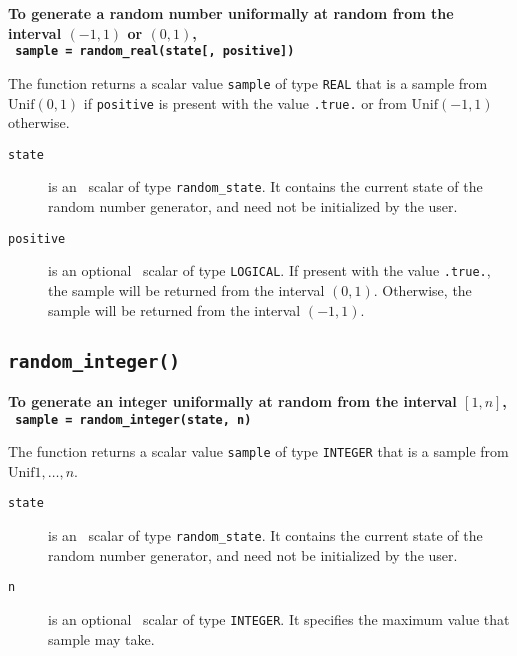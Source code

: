 \textbf{\noindent
   To generate a random number uniformally at random from the interval $(-1,1)$ or $(0,1)$,
   \vspace*{0.1cm} \\
   \texttt{ \hspace*{0.2cm}
      sample = random\_real(state[, positive])
   }
   \vspace{0.3cm}
}

\noindent
The function returns a scalar value {\tt sample} of type {\tt REAL} that is a
sample from $\mathrm{Unif}(0,1)$ if {\tt positive} is present with the value
{\tt .true.} or from $\mathrm{Unif}(-1,1)$ otherwise.

\begin{description}

\item[\texttt{state}] is an \intentinout\ scalar of
type  {\tt random\_state}. It contains the current state of the random number
generator, and need not be initialized by the user.

\item[\texttt{positive}] is an optional \intentin\ scalar of type {\tt LOGICAL}.
   If present with the value {\tt .true.}, the sample will be returned from
   the interval $(0,1)$. Otherwise, the sample will be returned from the
   interval $(-1,1)$.

\end{description}

\subsection{\texttt{random\_integer()}}

\textbf{\noindent
   To generate an integer uniformally at random from the interval $[1,n]$,
   \vspace*{0.1cm} \\
   \texttt{ \hspace*{0.2cm}
      sample = random\_integer(state, n)
   }
   \vspace{0.3cm}
}

\noindent
The function returns a scalar value {\tt sample} of type {\tt INTEGER} that is a
sample from $\mathrm{Unif}{1, \ldots, n}$.

\begin{description}

\item[\texttt{state}] is an \intentinout\ scalar of
type  {\tt random\_state}. It contains the current state of the random number
generator, and need not be initialized by the user.

\item[\texttt{n}] is an optional \intentin\ scalar of type {\tt INTEGER}.
   It specifies the maximum value that sample may take.

\end{description}

